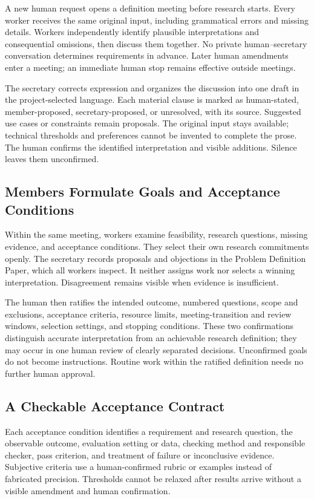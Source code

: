 \documentclass[11pt]{article}
\begin{document}
A new human request opens a definition meeting before research starts. Every worker receives the same original input, including grammatical errors and missing details. Workers independently identify plausible interpretations and consequential omissions, then discuss them together. No private human--secretary conversation determines requirements in advance. Later human amendments enter a meeting; an immediate human stop remains effective outside meetings.

The secretary corrects expression and organizes the discussion into one draft in the project-selected language. Each material clause is marked as human-stated, member-proposed, secretary-proposed, or unresolved, with its source. Suggested use cases or constraints remain proposals. The original input stays available; technical thresholds and preferences cannot be invented to complete the prose. The human confirms the identified interpretation and visible additions. Silence leaves them unconfirmed.

\subsection{Members Formulate Goals and Acceptance Conditions}

Within the same meeting, workers examine feasibility, research questions, missing evidence, and acceptance conditions. They select their own research commitments openly. The secretary records proposals and objections in the Problem Definition Paper, which all workers inspect. It neither assigns work nor selects a winning interpretation. Disagreement remains visible when evidence is insufficient.

The human then ratifies the intended outcome, numbered questions, scope and exclusions, acceptance criteria, resource limits, meeting-transition and review windows, selection settings, and stopping conditions. These two confirmations distinguish accurate interpretation from an achievable research definition; they may occur in one human review of clearly separated decisions. Unconfirmed goals do not become instructions. Routine work within the ratified definition needs no further human approval.

\subsection{A Checkable Acceptance Contract}

Each acceptance condition identifies a requirement and research question, the observable outcome, evaluation setting or data, checking method and responsible checker, pass criterion, and treatment of failure or inconclusive evidence. Subjective criteria use a human-confirmed rubric or examples instead of fabricated precision. Thresholds cannot be relaxed after results arrive without a visible amendment and human confirmation.
\end{document}
